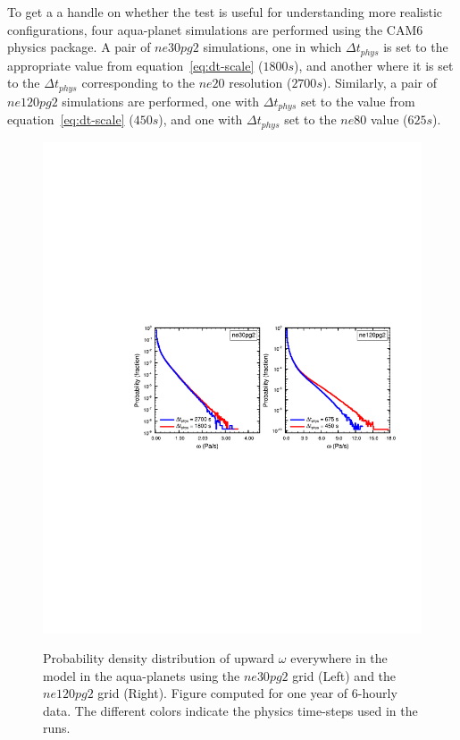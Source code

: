 \documentclass{agujournal}
\begin{document}
To get a a handle on whether the test is useful for understanding more realistic configurations, four aqua-planet simulations are performed using the CAM6 physics package. A pair of $ne30pg2$ simulations, one in which $\Delta t_{phys}$ is set to the appropriate value from equation~\eqref{eq:dt-scale} ($1800s$), and another where it is set to the $\Delta t_{phys}$ corresponding to the $ne20$ resolution ($2700s$). Similarly, a pair of $ne120pg2$ simulations are performed, one with $\Delta t_{phys}$ set to the value from equation~\eqref{eq:dt-scale} ($450s$), and one with $\Delta t_{phys}$ set to the $ne80$ value ($625s$). 

\begin{figure}[t]
\begin{center}
\noindent\includegraphics[width=30pc,angle=0]{figs/panel_pdf_dtphys.pdf}\\
\end{center}
\caption{Probability density distribution of upward $\omega$ everywhere in the model in the aqua-planets using the $ne30pg2$ grid (Left) and the $ne120pg2$ grid (Right). Figure computed for one year of 6-hourly data. The different colors indicate the physics time-steps used in the runs.}
\label{fig:pdf-dtphys}
\end{figure}
\end{document}
